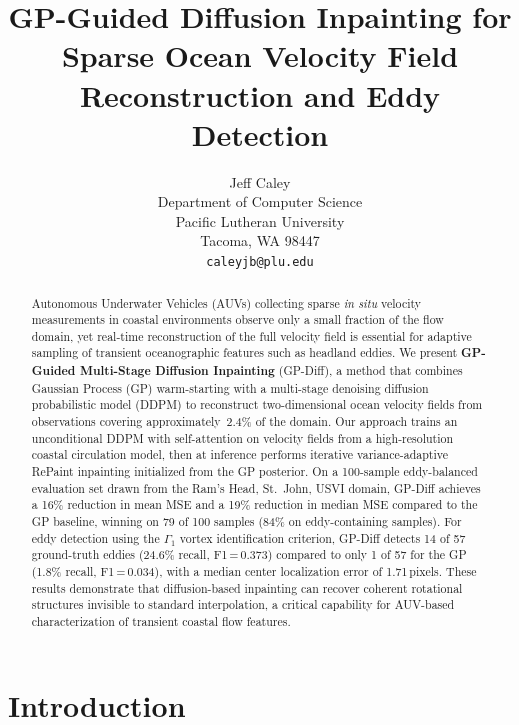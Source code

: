 \documentclass{article}
\title{GP-Guided Diffusion Inpainting for Sparse Ocean Velocity Field Reconstruction and Eddy Detection}
\author{
  Jeff Caley \\
  Department of Computer Science\\
  Pacific Lutheran University\\
  Tacoma, WA 98447 \\
  \texttt{caleyjb@plu.edu} \\
}
\begin{document}
\maketitle

\begin{abstract}
Autonomous Underwater Vehicles (AUVs) collecting sparse \textit{in situ} velocity measurements in coastal environments observe only a small fraction of the flow domain, yet real-time reconstruction of the full velocity field is essential for adaptive sampling of transient oceanographic features such as headland eddies. We present \textbf{GP-Guided Multi-Stage Diffusion Inpainting} (GP-Diff), a method that combines Gaussian Process (GP) warm-starting with a multi-stage denoising diffusion probabilistic model (DDPM) to reconstruct two-dimensional ocean velocity fields from observations covering approximately~2.4\% of the domain. Our approach trains an unconditional DDPM with self-attention on velocity fields from a high-resolution coastal circulation model, then at inference performs iterative variance-adaptive RePaint inpainting initialized from the GP posterior. On a 100-sample eddy-balanced evaluation set drawn from the Ram's Head, St.\ John, USVI domain, GP-Diff achieves a 16\% reduction in mean MSE and a 19\% reduction in median MSE compared to the GP baseline, winning on 79 of 100 samples (84\% on eddy-containing samples). For eddy detection using the $\Gamma_1$ vortex identification criterion, GP-Diff detects 14 of 57 ground-truth eddies (24.6\% recall, F1\,=\,0.373) compared to only 1 of 57 for the GP (1.8\% recall, F1\,=\,0.034), with a median center localization error of 1.71\,pixels. These results demonstrate that diffusion-based inpainting can recover coherent rotational structures invisible to standard interpolation, a critical capability for AUV-based characterization of transient coastal flow features.
\end{abstract}


\section{Introduction}
\label{sec:intro}
\end{document}

